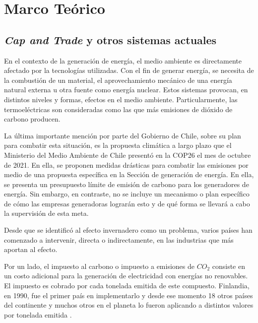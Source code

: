 
\chapter{Marco Teórico}
\label{c2} 


\section{\textit{Cap and Trade} y otros sistemas actuales}\label{c22}

En el contexto de la generación de energía, el medio ambiente es directamente afectado por la tecnologías utilizadas. Con el fin de generar energía, se necesita de la combustión de un material, el aprovechamiento mecánico de una energía natural externa u otra fuente como energía nuclear. Estos sistemas provocan, en distintos niveles y formas, efectos en el medio ambiente. Particularmente, las termoeléctricas son consideradas como las que más emisiones de dióxido de carbono producen.
\vspace{2.5mm}

La última importante mención por parte del Gobierno de Chile, sobre su plan para combatir esta situación, es la propuesta climática a largo plazo que el Ministerio del Medio Ambiente de Chile presentó en la COP26 el mes de octubre de 2021. En ella, se proponen medidas drásticas para combatir las emisiones por medio de una propuesta específica en la Sección de generación de energía. En ella, se presenta un presupuesto límite de emisión de carbono para los generadores de energía. Sin  embargo, en contraste, no se incluye un mecanismo o plan específico de cómo las empresas generadoras lograrán esto y de qué forma se llevará a cabo la supervisión de esta meta.
\vspace{2.5mm}

Desde que se identificó al efecto invernadero como un problema, varios países han comenzado a intervenir, directa o indirectamente, en las industrias que más aportan al efecto. 
\vspace{2.5mm}

Por un lado, el impuesto al carbono o impuesto a emisiones de $CO_2$ consiste en un costo adicional para la generación de electricidad con energías no renovables. El impuesto es cobrado por cada tonelada emitida de este compuesto. Finlandia, en 1990, fue el primer país en implementarlo y desde ese momento 18 otros países del continente y muchos otros en el planeta lo fueron aplicando a distintos valores por tonelada emitida .
\vspace{2.5mm}

